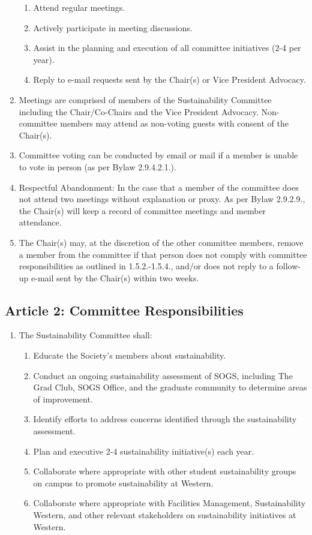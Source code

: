 \begin{enumerate}[label*=\arabic*., align=left]
\begin{enumerate}[label*=\arabic*., align=left]
\item Attend regular meetings.
\item Actively participate in meeting discussions.
\item Assist in the planning and execution of all committee initiatives (2-4 per year).
\item Reply to e-mail requests sent by the Chair(s) or Vice President Advocacy.
\end{enumerate}
\item Meetings are comprised of members of the Sustainability Committee including the Chair/Co-Chairs and the Vice President Advocacy. Non-committee members may attend as non-voting guests with consent of the Chair(s).
\item Committee voting can be conducted by email or mail if a member is unable to vote in person (as per Bylaw 2.9.4.2.1.).
\item Respectful Abandonment: In the case that a member of the committee does not attend two meetings without explanation or proxy. As per Bylaw 2.9.2.9., the Chair(s) will keep a record of committee meetings and member attendance.
\item The Chair(s) may, at the discretion of the other committee members, remove a member from the committee if that person does not comply with committee responsibilities as outlined in 1.5.2.-1.5.4., and/or does not reply to a follow-up e-mail sent by the Chair(s) within two weeks.
\end{enumerate}

\subsection{Article 2: Committee Responsibilities}
\begin{enumerate}[label*=\arabic*., align=left]	
\item The Sustainability Committee shall:
\begin{enumerate}[label*=\arabic*., align=left]	
\item Educate the Society’s members about sustainability.
\item Conduct an ongoing sustainability assessment of SOGS, including The Grad Club, SOGS Office, and the graduate community to determine areas of improvement.
\item Identify efforts to address concerns identified through the sustainability assessment.
\item Plan and executive 2-4 sustainability initiative(s) each year.
\item Collaborate where appropriate with other student sustainability groups on campus to promote sustainability at Western.
\item Collaborate where appropriate with Facilities Management, Sustainability Western, and other relevant stakeholders on sustainability initiatives at Western.
\end{enumerate}
\end{enumerate}

